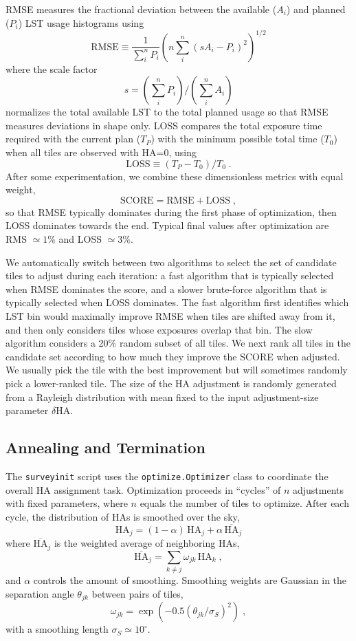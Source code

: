 \documentclass[12pt]{article}
\begin{document}
RMSE measures the fractional deviation between the available ($A_i$) and planned ($P_i$) LST usage histograms using
$$
\text{RMSE} \equiv \frac{1}{\sum_i^n P_i}
\left( n \sum_i^n (s A_i - P_i)^2 \right)^{1/2}
$$
where the scale factor
$$
s = (\sum_i^n P_i) / (\sum_i^n A_i)
$$
normalizes the total available LST to the total planned usage so that RMSE measures deviations in shape only.  LOSS compares the total exposure time required with the current plan ($T_P$) with the minimum possible total time ($T_0$) when all tiles are observed with HA=0, using
$$
\text{LOSS} \equiv (T_P - T_0) / T_0 \; .
$$
After some experimentation, we combine these dimensionless metrics with equal weight,
$$
\text{SCORE} = \text{RMSE} + \text{LOSS} \; ,
$$
so that RMSE typically dominates during the first phase of optimization, then LOSS dominates towards the end.  Typical final values after optimization are RMS $\simeq 1$\% and LOSS $\simeq 3$\%.

We automatically switch between two algorithms to select the set of candidate tiles to adjust during each iteration: a fast algorithm that is typically selected when RMSE dominates the score, and a slower brute-force algorithm that is typically selected when LOSS dominates.  The fast algorithm first identifies which LST bin would maximally improve RMSE when tiles are shifted away from it, and then only considers tiles whose exposures overlap that bin.  The slow algorithm considers a 20\% random subset of all tiles.  We next rank all tiles in the candidate set according to how much they improve the SCORE when adjusted. We usually pick the tile with the best improvement but will sometimes randomly pick a lower-ranked tile. The size of the HA adjustment is randomly generated from a Rayleigh distribution with mean fixed to the input adjustment-size parameter $\delta\text{HA}$.

\subsection{Annealing and Termination}

The {\tt surveyinit} script uses the {\tt optimize.Optimizer} class to coordinate the overall HA assignment task. Optimization proceeds in ``cycles'' of $n$ adjustments with fixed parameters, where $n$ equals the number of tiles to optimize. After each cycle, the distribution of HAs is smoothed over the sky,
$$
\text{HA}_j = (1 - \alpha)\,\text{HA}_j + \alpha\,\overline{\text{HA}}_j
$$
where $\overline{\text{HA}}_j$ is the weighted average of neighboring HAs,
$$
\overline{\text{HA}}_j = \sum_{k\ne j} \omega_{jk}\,\text{HA}_k \; ,
$$
and $\alpha$ controls the amount of smoothing.  Smoothing weights are Gaussian in the separation angle $\theta_{jk}$ between pairs of tiles,
$$
\omega_{jk} = \exp\left( -0.5(\theta_{jk} / \sigma_S)^2 \right) \; ,
$$
with a smoothing length $\sigma_S \simeq 10^\circ$.
\end{document}
